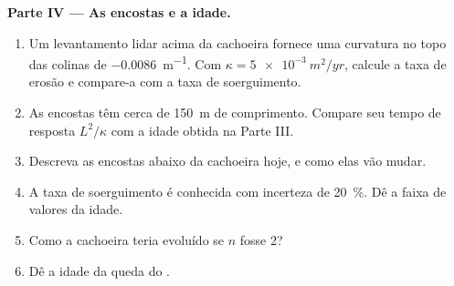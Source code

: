 \begin{problem}
\medskip\noindent\textbf{Parte IV --- As encostas e a idade.}
\begin{enumerate}[resume]
\item Um levantamento lidar acima da cachoeira fornece uma curvatura no
  topo das colinas de \qty{-0.0086}{m^{-1}}. Com $\kappa = \qty{5e-3}{m^2/yr}$, calcule a
  taxa de erosão e compare-a com a taxa de soerguimento.
\item As encostas têm cerca de \qty{150}{m} de comprimento. Compare seu tempo de resposta
  $L^2/\kappa$ com a idade obtida na Parte III.
\item Descreva as encostas abaixo da cachoeira hoje, e como elas
  vão mudar.
\item A taxa de soerguimento é conhecida com incerteza de \qty{20}{\percent}. Dê a
  faixa de valores da idade.
\item Como a cachoeira teria evoluído se $n$ fosse 2?
\item Dê a idade da queda do .
\end{enumerate}
\end{problem}
